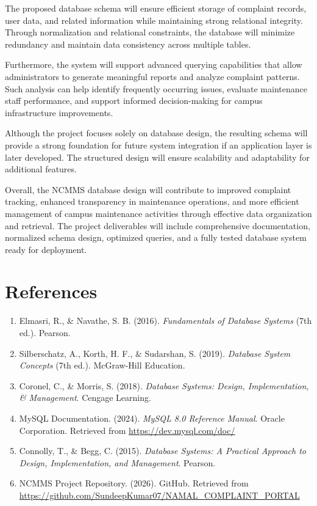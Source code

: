 \documentclass[12pt,a4paper]{article}
\begin{document}
The proposed database schema will ensure efficient storage of complaint records, user data, and related information while maintaining strong relational integrity. Through normalization and relational constraints, the database will minimize redundancy and maintain data consistency across multiple tables.

Furthermore, the system will support advanced querying capabilities that allow administrators to generate meaningful reports and analyze complaint patterns. Such analysis can help identify frequently occurring issues, evaluate maintenance staff performance, and support informed decision-making for campus infrastructure improvements.

Although the project focuses solely on database design, the resulting schema will provide a strong foundation for future system integration if an application layer is later developed. The structured design will ensure scalability and adaptability for additional features.

Overall, the NCMMS database design will contribute to improved complaint tracking, enhanced transparency in maintenance operations, and more efficient management of campus maintenance activities through effective data organization and retrieval. The project deliverables will include comprehensive documentation, normalized schema design, optimized queries, and a fully tested database system ready for deployment.

\newpage

\section{References}

\begin{enumerate}
    \item Elmasri, R., \& Navathe, S. B. (2016). \textit{Fundamentals of Database Systems} (7th ed.). Pearson.
    
    \item Silberschatz, A., Korth, H. F., \& Sudarshan, S. (2019). \textit{Database System Concepts} (7th ed.). McGraw-Hill Education.
    
    \item Coronel, C., \& Morris, S. (2018). \textit{Database Systems: Design, Implementation, \& Management}. Cengage Learning.
    
    \item MySQL Documentation. (2024). \textit{MySQL 8.0 Reference Manual}. Oracle Corporation. Retrieved from \url{https://dev.mysql.com/doc/}
    
    \item Connolly, T., \& Begg, C. (2015). \textit{Database Systems: A Practical Approach to Design, Implementation, and Management}. Pearson.
    
    \item NCMMS Project Repository. (2026). GitHub. Retrieved from \url{https://github.com/SundeepKumar07/NAMAL_COMPLAINT_PORTAL}
\end{enumerate}
\end{document}

